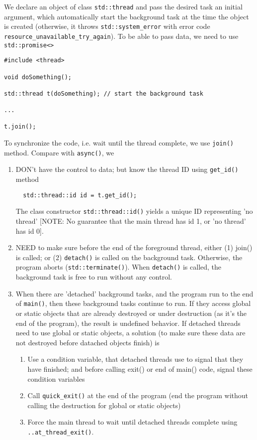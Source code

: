 We declare an object of class \verb!std::thread! and pass the desired task an
initial argument, which automatically start the background task at the time the
object is created (otherwise, it throws \verb!std::system_error! with error
code \verb!resource_unavailable_try_again!). To be able to pass data, we need to
use \verb!std::promise<>! 
\begin{verbatim}
#include <thread>

void doSomething();

std::thread t(doSomething); // start the background task

...

t.join();
\end{verbatim}
To synchronize the code, i.e. wait until the thread complete, we use
\verb!join()! method. Compare with \verb!async()!, we
\begin{enumerate}
  \item DON't have the control to data; but know the thread ID
  using \verb!get_id()! method
  \begin{lstlisting}
  std::thread::id id = t.get_id();
  \end{lstlisting}
  The class constructor \verb!std::thread::id()! yields a unique ID representing
  'no thread' [NOTE: No guarantee that the main thread has id 1, or 'no
  thread' has id 0].
  
  \item NEED to make sure before the end of the foreground thread, either (1)
  join() is called; or (2) \verb!detach()! is called on the background task.
  Otherwise, the program aborts (\verb!std::terminate()!). When  \verb!detach()!
  is called, the background task is free to run without any  control.
  \item When there are 'detached' background tasks, and the program run to the
  end of \verb!main()!, then these background tasks continue to run. If they
  access global or static objects that are already destroyed or under
  destruction (as it's the end of the program), the result is undefined
  behavior. If detached threads need to use global or static objects, a solution
  (to make sure these data are not destroyed before datached objects finish) is
  \begin{enumerate}
    \item Use a condition variable, that detached threads use to signal that
    they have finished; and before calling exit() or end of main() code, signal
    these condition variables
    \item Call \verb!quick_exit()! at the end of the program (end the program
    without calling the destruction for global or static objects)
    \item Force the main thread to wait until detached threads complete using
    \verb!..at_thread_exit()!.
  \end{enumerate}
\end{enumerate}

